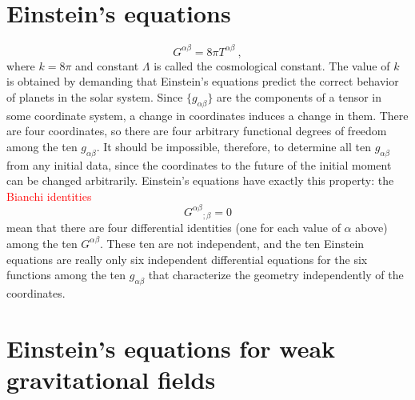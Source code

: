 \documentclass[12pt,a4paper]{article}
\begin{document}
\section{Einstein’s equations}
\begin{equation}
G^{\alpha\beta}  = 8\pi T^{\alpha\beta} ~,
\end{equation}
where $k = 8\pi$ and constant $\Lambda$ is called the cosmological constant. The value of $k$ is obtained by demanding that Einstein's equations predict the correct behavior of planets in the solar system. Since $\{g_{\alpha\beta}\}$ are the components of a tensor in some coordinate system, a change in coordinates induces a change in them. There are four coordinates, so there are four arbitrary functional degrees of freedom among the ten $g_{\alpha\beta}$. It should be impossible, therefore, to determine all ten $g_{\alpha\beta}$ from any initial data, since the coordinates to the future of the initial moment can be changed arbitrarily. Einstein’s equations have exactly this property: the \textcolor{red}{Bianchi identities}
\begin{equation}
G^{\alpha\beta}{}_{;\beta} = 0
\end{equation}
mean that there are four differential identities (one for each value of $\alpha$ above) among the ten $G^{\alpha\beta}$. These ten are not independent, and the ten Einstein equations are really only six independent differential equations for the six functions among the ten $g_{\alpha\beta}$ that characterize the geometry independently of the coordinates.

\section{Einstein's equations for weak gravitational fields}








\end{document}
